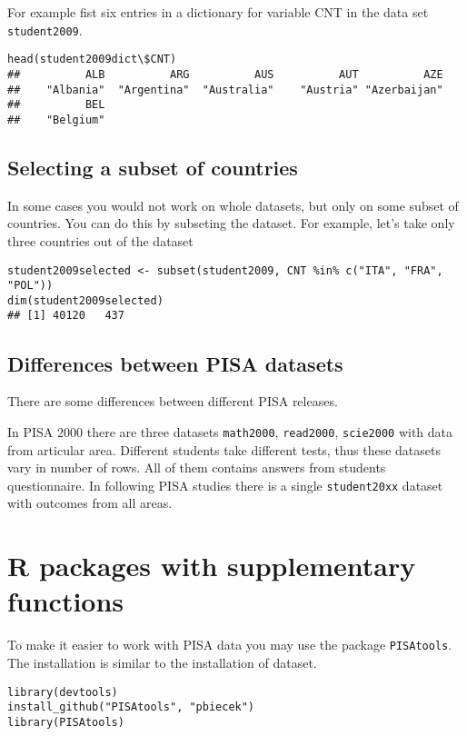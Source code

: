 For example fist six entries in a dictionary for variable CNT in the data set \verb:student2009:.
\begin{shaded}\begin{verbatim}
head(student2009dict\$CNT)
##          ALB          ARG          AUS          AUT          AZE 
##    "Albania"  "Argentina"  "Australia"    "Austria" "Azerbaijan" 
##          BEL 
##    "Belgium"
\end{verbatim}\end{shaded}

\subsection{Selecting a subset of countries}
In some cases you would not work on whole datasets, but only on some subset of countries. You can do this by subseting the dataset. For example, let's take only three countries out of the dataset

\begin{shaded}\begin{verbatim}
student2009selected <- subset(student2009, CNT %in% c("ITA", "FRA", "POL"))
dim(student2009selected)
## [1] 40120   437
\end{verbatim}\end{shaded}

\subsection{Differences between PISA datasets}

There are some differences between different PISA releases. 

In PISA 2000 there are three datasets \verb:math2000:, \verb:read2000:, \verb:scie2000: with data from articular area. Different students take different tests, thus these datasets vary in number of rows. 
All of them contains answers from students questionnaire. In following PISA studies there is a single \verb:student20xx: dataset with outcomes from all areas.


\section{R packages with supplementary functions}
To make it easier to work with PISA data you may use the package \verb:PISAtools:. The installation is similar to the installation of dataset.

\begin{shaded}\begin{verbatim}
library(devtools)
install_github("PISAtools", "pbiecek")
library(PISAtools)
\end{verbatim}\end{shaded}

